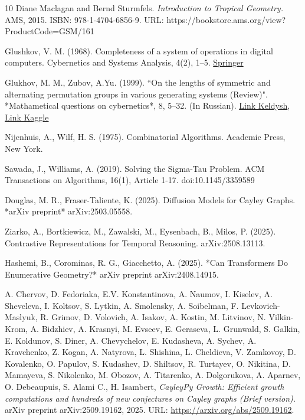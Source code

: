 \documentclass[reqno,11pt]{amsart}
\begin{document}
\begin{thebibliography}{10}
 Diane Maclagan and Bernd Sturmfels. \textit{Introduction to Tropical Geometry.} AMS, 2015. ISBN: 978-1-4704-6856-9. URL: https://bookstore.ams.org/view?ProductCode=GSM/161

Glushkov, V. M. (1968). Completeness of a system of operations in digital computers. Cybernetics and Systems Analysis, 4(2), 1–5.
\href{https://link.springer.com/article/10.1007/BF01073731}{Springer}

Glukhov, M. M., Zubov, A.Yu. (1999). “On the lengths of symmetric and alternating permutation groups in various generating systems (Review)". *Mathametical questions on cybernetics*, 8, 5–32. (In Russian).
\href{https://keldysh.ru/papers/1999/mvk/mvk1999_5.pdf}{Link Keldysh}, 
\href{https://www.kaggle.com/datasets/alexandervc/cayleypy-development-3-growth-computations/data?select=Glukhov_Zubov1999review.pdf}{Link Kaggle}

Nijenhuis, A., Wilf, H. S. (1975).
Combinatorial Algorithms.
Academic Press, New York.

Sawada, J., Williams, A. (2019).
Solving the Sigma-Tau Problem.
ACM Transactions on Algorithms, 16(1), Article 1-17.
doi:10.1145/3359589

Douglas, M. R., Fraser-Taliente, K. (2025). Diffusion Models for Cayley Graphs. *arXiv preprint* arXiv:2503.05558.

Ziarko, A., Bortkiewicz, M., Zawalski, M., Eysenbach, B., Milos, P. (2025).
Contrastive Representations for Temporal Reasoning.
arXiv:2508.13113.

Hashemi, B., Corominas, R. G., Giacchetto, A. (2025). *Can Transformers Do Enumerative Geometry?* arXiv preprint arXiv:2408.14915.

A. Chervov, D. Fedoriaka, E.V. Konstantinova, A. Naumov, I. Kiselev, A. Sheveleva, I. Koltsov, S. Lytkin, A. Smolensky, A. Soibelman, F. Levkovich-Maslyuk, R. Grimov, D. Volovich, A. Isakov, A. Kostin, M. Litvinov, N. Vilkin-Krom, A. Bidzhiev, A. Krasnyi, M. Evseev, E. Geraseva, L. Grunwald, S. Galkin, E. Koldunov, S. Diner, A. Chevychelov, E. Kudasheva, A. Sychev, A. Kravchenko, Z. Kogan, A. Natyrova, L. Shishina, L. Cheldieva, V. Zamkovoy, D. Kovalenko, O. Papulov, S. Kudashev, D. Shiltsov, R. Turtayev, O. Nikitina, D. Mamayeva, S. Nikolenko, M. Obozov, A. Titarenko, A. Dolgorukova, A. Aparnev, O. Debeaupuis, S. Alami C., H. Isambert,
\textit{CayleyPy Growth: Efficient growth computations and hundreds of new conjectures on Cayley graphs (Brief version).}
arXiv preprint arXiv:2509.19162, 2025.
URL: \url{https://arxiv.org/abs/2509.19162}.

\end{thebibliography}
\end{document}
